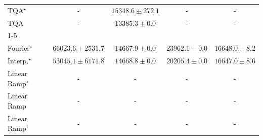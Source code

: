 \begin{tabular}{l|cccc|}
TQA$^\star$ & {\cellcolor[HTML]{000000}} \color[HTML]{F1F1F1} {\cellcolor{white}} \color{black} - & {\cellcolor[HTML]{FFF9C7}} \color[HTML]{000000} $15348.6\pm 272.1$ & {\cellcolor[HTML]{000000}} \color[HTML]{F1F1F1} {\cellcolor{white}} \color{black} - & {\cellcolor[HTML]{000000}} \color[HTML]{F1F1F1} {\cellcolor{white}} \color{black} - \\
TQA & {\cellcolor[HTML]{000000}} \color[HTML]{F1F1F1} {\cellcolor{white}} \color{black} - & {\cellcolor[HTML]{FFFBD3}} \color[HTML]{000000} $13385.3\pm 0.0$ & {\cellcolor[HTML]{000000}} \color[HTML]{F1F1F1} {\cellcolor{white}} \color{black} - & {\cellcolor[HTML]{000000}} \color[HTML]{F1F1F1} {\cellcolor{white}} \color{black} - \\
\cline{1-5}
\multicolumn{5}{c}{\rule{0pt}{8pt}PP} \\
\midrule
Fourier$^\star$ & {\cellcolor[HTML]{004529}} \color[HTML]{F1F1F1} $66023.6\pm 2531.7$ & {\cellcolor[HTML]{FAFDC9}} \color[HTML]{000000} $14667.9\pm 0.0$ & {\cellcolor[HTML]{DAF0A4}} \color[HTML]{000000} $23962.1\pm 0.0$ & {\cellcolor[HTML]{F8FCBD}} \color[HTML]{000000} $16648.0\pm 8.2$ \\
Interp.$^\star$ & {\cellcolor[HTML]{1E8041}} \color[HTML]{F1F1F1} $53045.1\pm 6171.8$ & {\cellcolor[HTML]{FAFDC9}} \color[HTML]{000000} $14668.8\pm 0.0$ & {\cellcolor[HTML]{EAF7AF}} \color[HTML]{000000} $20205.4\pm 0.0$ & {\cellcolor[HTML]{F8FCBD}} \color[HTML]{000000} $16647.0\pm 8.6$ \\
Linear Ramp$^\star$ & {\cellcolor[HTML]{000000}} \color[HTML]{F1F1F1} {\cellcolor{white}} \color{black} - & {\cellcolor[HTML]{000000}} \color[HTML]{F1F1F1} {\cellcolor{white}} \color{black} - & {\cellcolor[HTML]{000000}} \color[HTML]{F1F1F1} {\cellcolor{white}} \color{black} - & {\cellcolor[HTML]{000000}} \color[HTML]{F1F1F1} {\cellcolor{white}} \color{black} - \\
Linear Ramp & {\cellcolor[HTML]{000000}} \color[HTML]{F1F1F1} {\cellcolor{white}} \color{black} - & {\cellcolor[HTML]{000000}} \color[HTML]{F1F1F1} {\cellcolor{white}} \color{black} - & {\cellcolor[HTML]{000000}} \color[HTML]{F1F1F1} {\cellcolor{white}} \color{black} - & {\cellcolor[HTML]{000000}} \color[HTML]{F1F1F1} {\cellcolor{white}} \color{black} - \\
Linear Ramp$^\dagger$ & {\cellcolor[HTML]{000000}} \color[HTML]{F1F1F1} {\cellcolor{white}} \color{black} - & {\cellcolor[HTML]{000000}} \color[HTML]{F1F1F1} {\cellcolor{white}} \color{black} - & {\cellcolor[HTML]{000000}} \color[HTML]{F1F1F1} {\cellcolor{white}} \color{black} - & {\cellcolor[HTML]{000000}} \color[HTML]{F1F1F1} {\cellcolor{white}} \color{black} - \\

\end{tabular}
